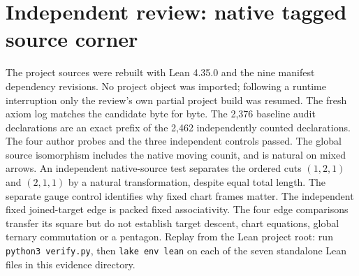 \section*{Independent review: native tagged source corner}
The project sources were rebuilt with Lean 4.35.0 and the nine manifest dependency revisions. No project object was imported; following a runtime interruption only the review's own partial project build was resumed. The fresh axiom log matches the candidate byte for byte. The 2,376 baseline audit declarations are an exact prefix of the 2,462 independently counted declarations. The four author probes and the three independent controls passed.
The global source isomorphism includes the native moving counit, and is natural on mixed arrows. An independent native-source test separates the ordered cuts $(1,2,1)$ and $(2,1,1)$ by a natural transformation, despite equal total length. The separate gauge control identifies why fixed chart frames matter. The independent fixed joined-target edge is packed fixed associativity. The four edge comparisons transfer its square but do not establish target descent, chart equations, global ternary commutation or a pentagon.
Replay from the Lean project root: run \texttt{python3 verify.py}, then \texttt{lake env lean} on each of the seven standalone Lean files in this evidence directory.
